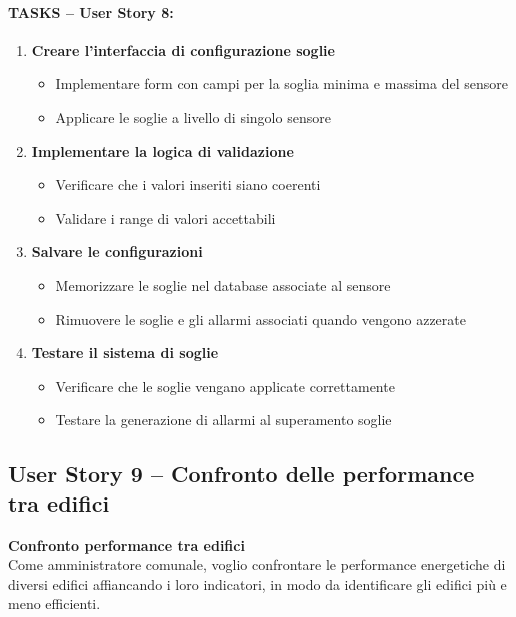 \paragraph*{TASKS – User Story 8:}
\begin{enumerate}
    \item \textbf{Creare l'interfaccia di configurazione soglie}
    \begin{itemize}
        \item Implementare form con campi per la soglia minima e massima del sensore
        \item Applicare le soglie a livello di singolo sensore
    \end{itemize}
    \item \textbf{Implementare la logica di validazione}
    \begin{itemize}
        \item Verificare che i valori inseriti siano coerenti
        \item Validare i range di valori accettabili
    \end{itemize}
    \item \textbf{Salvare le configurazioni}
    \begin{itemize}
        \item Memorizzare le soglie nel database associate al sensore
        \item Rimuovere le soglie e gli allarmi associati quando vengono azzerate
    \end{itemize}
    \item \textbf{Testare il sistema di soglie}
    \begin{itemize}
        \item Verificare che le soglie vengano applicate correttamente
        \item Testare la generazione di allarmi al superamento soglie
    \end{itemize}
\end{enumerate}


\subsection{User Story 9 – Confronto delle performance tra edifici}
\label{us:analisiComparative}

\textbf{Confronto performance tra edifici} \\
Come amministratore comunale, voglio confrontare le performance energetiche di diversi edifici affiancando i loro indicatori, in modo da identificare gli edifici più e meno efficienti.

